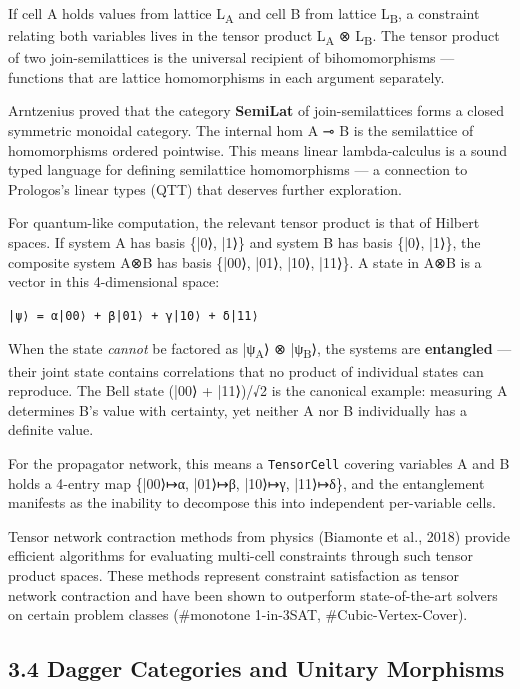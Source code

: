 \documentclass[11pt]{article}
\begin{document}
If cell A holds values from lattice L\textsubscript{A} and cell B from lattice L\textsubscript{B}, a constraint
relating both variables lives in the tensor product L\textsubscript{A} ⊗ L\textsubscript{B}. The tensor product
of two join-semilattices is the universal recipient of bihomomorphisms ---
functions that are lattice homomorphisms in each argument separately.

Arntzenius proved that the category \textbf{SemiLat} of join-semilattices forms a
closed symmetric monoidal category. The internal hom A ⊸ B is the semilattice
of homomorphisms ordered pointwise. This means linear lambda-calculus is a sound
typed language for defining semilattice homomorphisms --- a connection to
Prologos's linear types (QTT) that deserves further exploration.

For quantum-like computation, the relevant tensor product is that of Hilbert
spaces. If system A has basis \{|0⟩, |1⟩\} and system B has basis \{|0⟩, |1⟩\},
the composite system A⊗B has basis \{|00⟩, |01⟩, |10⟩, |11⟩\}. A state in
A⊗B is a vector in this 4-dimensional space:

\begin{verbatim}
|ψ⟩ = α|00⟩ + β|01⟩ + γ|10⟩ + δ|11⟩
\end{verbatim}

When the state \emph{cannot} be factored as |ψ\textsubscript{A}⟩ ⊗ |ψ\textsubscript{B}⟩, the systems are
\textbf{entangled} --- their joint state contains correlations that no product of
individual states can reproduce. The Bell state (|00⟩ + |11⟩)/√2 is the
canonical example: measuring A determines B's value with certainty, yet
neither A nor B individually has a definite value.

For the propagator network, this means a \texttt{TensorCell} covering variables A and B
holds a 4-entry map \{|00⟩↦α, |01⟩↦β, |10⟩↦γ, |11⟩↦δ\}, and the entanglement
manifests as the inability to decompose this into independent per-variable cells.

Tensor network contraction methods from physics (Biamonte et al., 2018) provide
efficient algorithms for evaluating multi-cell constraints through such tensor
product spaces. These methods represent constraint satisfaction as tensor network
contraction and have been shown to outperform state-of-the-art solvers on certain
problem classes (\#monotone 1-in-3SAT, \#Cubic-Vertex-Cover).
\subsection{3.4 Dagger Categories and Unitary Morphisms}
\label{sec:orgde40646}
\end{document}
